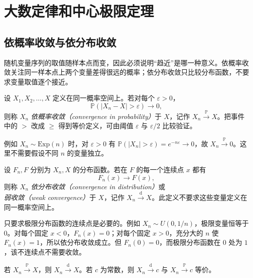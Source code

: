 \section{大数定律和中心极限定理}
\label{sec:study-limit-theorems}

\subsection{依概率收敛与依分布收敛}
\label{subsec:study-probability-distribution-convergence}

随机变量序列的取值随样本点而变，因此必须说明“趋近”是哪一种意义。依概率收敛关注同一样本点上两个变量差得很远的概率；依分布收敛只比较分布函数，不要求变量取值逐个接近。

\begin{definition}
\label{def:study-convergence-probability}
设 $X_1,X_2,\ldots,X$ 定义在同一概率空间上。若对每个 $\varepsilon>0$，
\begin{equation}
  \mathbb P(|X_n-X|>\varepsilon)\longrightarrow0,
  \label{eq:study-convergence-probability}
\end{equation}
则称 $X_n$ \emph{依概率收敛（convergence in probability）}于 $X$，记作 $X_n\xrightarrow{\mathbb P}X$。把事件中的 $>$ 改成 $\ge$ 得到等价定义，可由阈值 $\varepsilon$ 与 $\varepsilon/2$ 比较验证。
\end{definition}

例如 $X_n\sim\mathrm{Exp}(n)$ 时，对 $\varepsilon>0$ 有 $\mathbb P(|X_n|>\varepsilon)=e^{-n\varepsilon}\to0$，故 $X_n\xrightarrow{\mathbb P}0$。这里不需要假设不同 $n$ 的变量独立。

\begin{definition}
\label{def:study-convergence-distribution}
设 $F_n,F$ 分别为 $X_n,X$ 的分布函数。若在 $F$ 的每一个连续点 $x$ 都有
\begin{equation}
  F_n(x)\longrightarrow F(x),
  \label{eq:study-convergence-distribution}
\end{equation}
则称 $X_n$ \emph{依分布收敛（convergence in distribution）}或\emph{弱收敛（weak convergence）}于 $X$，记作 $X_n\xrightarrow{\mathrm d}X$。此定义不要求这些变量定义在同一概率空间上。
\end{definition}

只要求极限分布函数的连续点是必要的。例如 $X_n\sim U(0,1/n)$，极限变量恒等于 $0$。对每个固定 $x<0$，$F_n(x)=0$；对每个固定 $x>0$，充分大的 $n$ 使 $F_n(x)=1$，所以依分布收敛成立。但 $F_n(0)=0$，而极限分布函数在 $0$ 处为 $1$，该不连续点不需要收敛。

\begin{proposition}
\label{prop:study-convergence-relations}
若 $X_n\xrightarrow{\mathbb P}X$，则 $X_n\xrightarrow{\mathrm d}X$。若 $c$ 为常数，则 $X_n\xrightarrow{\mathrm d}c$ 与 $X_n\xrightarrow{\mathbb P}c$ 等价。
\end{proposition}

